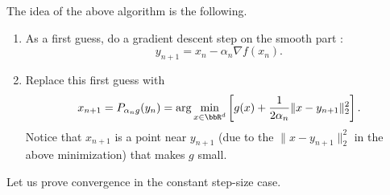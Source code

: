      The idea of the above algorithm is the following.
     \begin{enumerate}
         \item As a first guess, do a gradient descent step on the smooth part :
               \begin{equation}
                   y_{n+1} =x_n - \alpha_n\nabla f(x_n).
               \end{equation}
         \item Replace this first guess with
               \begin{equation}
                   x_{n+1} = P_{\alpha_n g}(y_n) = \arg\min_{x\in \bbR^{d}}\left[ g(x) + \frac{1}{2\alpha_n}\|x-y_{n+1}\|_2^2 \right].
               \end{equation}
               Notice that $x_{n+1}$ is a point near $y_{n+1}$ (due to the $\|x-y_{n+1}\|_2^2$ in the above minimization) that makes $g$ small.
     \end{enumerate}
 
     Let us prove convergence in the constant step-size case.
 
 
